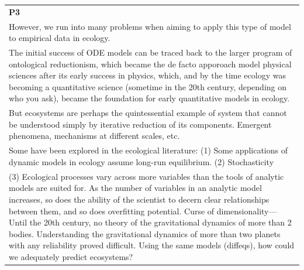 \documentclass[11pt]{article}
\begin{document}
\begin{longtable}[]{@{}l@{}}
\toprule
\endhead
\begin{minipage}[t]{0.05\columnwidth}\raggedright
\textbf{P3}\strut
\end{minipage}\tabularnewline
\begin{minipage}[t]{0.05\columnwidth}\raggedright
However, we run into many problems when aiming to apply this type of
model to empirical data in ecology.\strut
\end{minipage}\tabularnewline
\begin{minipage}[t]{0.05\columnwidth}\raggedright
The initial success of ODE models can be traced back to the larger
program of ontological reductionism, which became the de facto apporoach
model physical sciences after its early success in physics, which, and
by the time ecology was becoming a quantitative science (sometime in the
20th century, depending on who you ask), became the foundation for early
quantitative models in ecology.\strut
\end{minipage}\tabularnewline
\begin{minipage}[t]{0.05\columnwidth}\raggedright
But ecosystems are perhaps the quintessential example of system that
cannot be understood simply by iterative reduction of its components.
Emergent phenomena, mechanisms at different scales, etc.\strut
\end{minipage}\tabularnewline
\begin{minipage}[t]{0.05\columnwidth}\raggedright
Some have been explored in the ecological literature: (1) Some
applications of dynamic models in ecology assume long-run equilibrium.
(2) Stochasticity\strut
\end{minipage}\tabularnewline
\begin{minipage}[t]{0.05\columnwidth}\raggedright
(3) Ecological processes vary across more variables than the tools of
analytic models are suited for. As the number of variables in an
analytic model increases, so does the ability of the scientist to decern
clear relationships between them, and so does overfitting potential.
Curse of dimensionality--- Until the 20th century, no theory of the
gravitational dynamics of more than 2 bodies. Understanding the
gravitational dynamics of more than two planets with any reliability
proved difficult. Using the same models (diffeqs), how could we
adequately predict ecosystems?\strut
\end{minipage}\tabularnewline
\bottomrule
\end{longtable}
\end{document}
